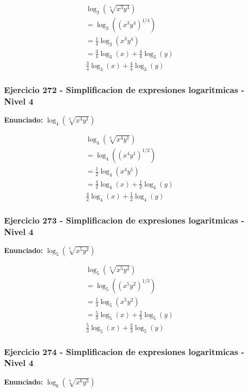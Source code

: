\documentclass[12pt,a4paper]{article}
\begin{document}
\[
\begin{aligned}
\log_{3}\left(\sqrt[4]{x^{3}y^{4}}\right)\\
=\log_{3}\left((x^{3}y^{4})^{1/4}\right)\\
=\frac{1}{4}\log_{3}\left(x^{3}y^{4}\right) \\
=\frac{3}{4}\log_{3}\left(x\right)+\frac{4}{4}\log_{3}\left(y\right)\\
\boxed{\frac{3}{4}\log_{3}\left(x\right)+\frac{4}{4}\log_{3}\left(y\right)}
\end{aligned}
\]


\subsubsection*{Ejercicio 272 - Simplificacion de expresiones logaritmicas - Nivel 4}
\textbf{Enunciado:} \(\log_{4}\left(\sqrt[2]{x^{4}y^{1}}\right)\)

\[
\begin{aligned}
\log_{4}\left(\sqrt[2]{x^{4}y^{1}}\right)\\
=\log_{4}\left((x^{4}y^{1})^{1/2}\right)\\
=\frac{1}{2}\log_{4}\left(x^{4}y^{1}\right) \\
=\frac{4}{2}\log_{4}\left(x\right)+\frac{1}{2}\log_{4}\left(y\right)\\
\boxed{\frac{4}{2}\log_{4}\left(x\right)+\frac{1}{2}\log_{4}\left(y\right)}
\end{aligned}
\]


\subsubsection*{Ejercicio 273 - Simplificacion de expresiones logaritmicas - Nivel 4}
\textbf{Enunciado:} \(\log_{5}\left(\sqrt[3]{x^{5}y^{2}}\right)\)

\[
\begin{aligned}
\log_{5}\left(\sqrt[3]{x^{5}y^{2}}\right)\\
=\log_{5}\left((x^{5}y^{2})^{1/3}\right)\\
=\frac{1}{3}\log_{5}\left(x^{5}y^{2}\right) \\
=\frac{5}{3}\log_{5}\left(x\right)+\frac{2}{3}\log_{5}\left(y\right)\\
\boxed{\frac{5}{3}\log_{5}\left(x\right)+\frac{2}{3}\log_{5}\left(y\right)}
\end{aligned}
\]


\subsubsection*{Ejercicio 274 - Simplificacion de expresiones logaritmicas - Nivel 4}
\textbf{Enunciado:} \(\log_{6}\left(\sqrt[4]{x^{6}y^{3}}\right)\)
\end{document}

